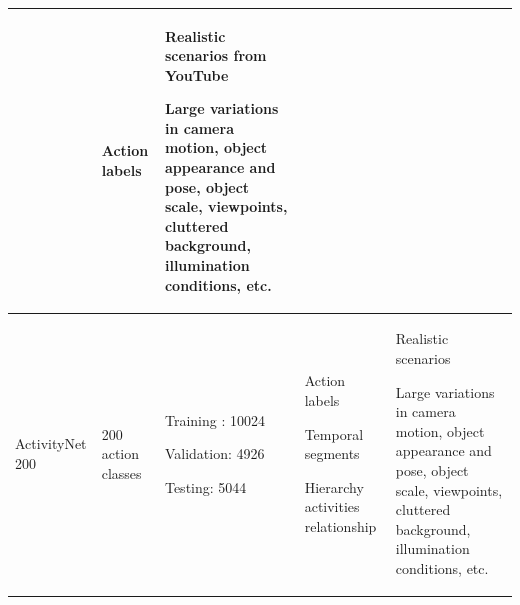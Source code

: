 \begin{table}
\begin{center}
\begin{tabular}{| p{2.5cm} | p{1.5cm} | p{4cm} | p{3cm} | p{4cm} |}
	    	& %
	    	\vspace{-5mm}
	    	\begin{myitemize}
	    		\item Action labels
	    	\end{myitemize}
	    	& %
	    	\vspace{-5mm}
	    	\begin{myitemize}
	    		\item Realistic scenarios from YouTube
	    		\item Large variations in camera motion, object appearance and pose, object scale, viewpoints, cluttered background, illumination conditions, etc.
	    	\end{myitemize}
	    	\\ \hline
	    	
	    	
	    	ActivityNet 200\cite{activitynet200}
	    	& %
	    	200 action classes
	    	& %
	    	\vspace{-5mm}
	    	\begin{myitemize}
	    		\item Training : 10024
	    		\item Validation: 4926
	    		\item Testing: 5044
	    	\end{myitemize}
	    	
	    	& %
	    	\vspace{-5mm}
	    	\begin{myitemize}
	    		\item Action labels
	    		\item Temporal segments
	    		\item Hierarchy activities relationship
	    	\end{myitemize}
	    	& %
	    	\vspace{-5mm}
	    	\begin{myitemize}
	    		\item Realistic scenarios
	    		\item Large variations in camera motion, object appearance and pose, object scale, viewpoints, cluttered background, illumination conditions, etc.
	    	\end{myitemize}
	    	\\ \hline
   	
		\end{tabular}
		\label{table:action_datasets}
	\end{center}
\end{table}

